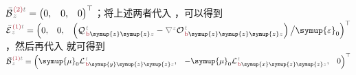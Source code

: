 $\bar{\mathcal{B}}^{\;\!\textcolor{Maroon}{(2)}\mathcolor{gray}{t}}_{\;\!  \mathcolor{gray}{z}} = \begin{pmatrix} 0, & 0, & 0 \end{pmatrix}^\top$；将上述两者代入 ，可以得到 $\bar{\mathcal{E}}^{\;\!\textcolor{Maroon}{(1)}\mathcolor{gray}{t}}_{\;\!  \mathcolor{gray}{z}} = \begin{pmatrix} 0, & 0, & \left( {\mathcal{Q}}^{\;\!\mathcolor{gray}{t}}_{\;\!\textcolor{Maroon}{\text{b}} \symup{z} \symup{z} \mathcolor{gray}{z}} - \mathcolor{gray}{\nabla^z} {\mathcal{O}}^{\;\!\mathcolor{gray}{t}}_{\;\!\textcolor{Maroon}{\text{b}} \symup{z} \symup{z} \symup{z} \mathcolor{gray}{z}} \right) \big/ {\symup{\varepsilon}}_0 \end{pmatrix}^\top$，然后再代入  就可得到 $\bar{\mathcal{B}}^{\;\!\textcolor{Maroon}{(1)}\mathcolor{gray}{t}}_{\;\!  \mathcolor{gray}{z}} = \begin{pmatrix} {\symup{\mu}}_0 {\mathcal{L}}^{\;\!\mathcolor{gray}{t}}_{\;\!\textcolor{Maroon}{\text{b}} \symup{y} \symup{z} \symup{z} \mathcolor{gray}{z}}, & - {\symup{\mu}}_0 {\mathcal{L}}^{\;\!\mathcolor{gray}{t}}_{\;\!\textcolor{Maroon}{\text{b}} \symup{x} \symup{z} \symup{z} \mathcolor{gray}{z}}, & 0 \end{pmatrix}^\top$

